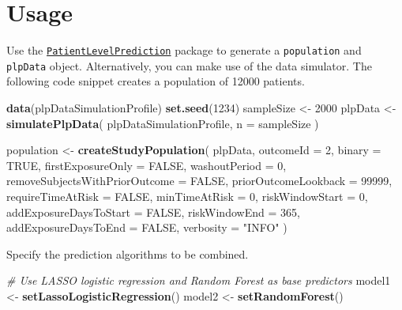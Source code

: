 \documentclass[
]{article}
\newenvironment{Shaded}{\begin{snugshade}}{\end{snugshade}}
\newcommand{\CommentTok}[1]{\textcolor[rgb]{0.56,0.35,0.01}{\textit{#1}}}
\newcommand{\DataTypeTok}[1]{\textcolor[rgb]{0.13,0.29,0.53}{#1}}
\newcommand{\DecValTok}[1]{\textcolor[rgb]{0.00,0.00,0.81}{#1}}
\newcommand{\KeywordTok}[1]{\textcolor[rgb]{0.13,0.29,0.53}{\textbf{#1}}}
\newcommand{\NormalTok}[1]{#1}
\newcommand{\OtherTok}[1]{\textcolor[rgb]{0.56,0.35,0.01}{#1}}
\newcommand{\StringTok}[1]{\textcolor[rgb]{0.31,0.60,0.02}{#1}}
\begin{document}
\hypertarget{usage}{%
\section{Usage}\label{usage}}

Use the
\href{http://github.com/OHDSI/PatientLevelPrediction}{\texttt{PatientLevelPrediction}}
package to generate a \texttt{population} and \texttt{plpData} object.
Alternatively, you can make use of the data simulator. The following
code snippet creates a population of 12000 patients.

\begin{Shaded}
\begin{Highlighting}[]
\KeywordTok{data}\NormalTok{(plpDataSimulationProfile)}
\KeywordTok{set.seed}\NormalTok{(}\DecValTok{1234}\NormalTok{)}
\NormalTok{sampleSize <-}\StringTok{ }\DecValTok{2000}
\NormalTok{plpData <-}\StringTok{ }\KeywordTok{simulatePlpData}\NormalTok{(}
\NormalTok{  plpDataSimulationProfile,}
  \DataTypeTok{n =}\NormalTok{ sampleSize}
\NormalTok{)}

\NormalTok{population <-}\StringTok{ }\KeywordTok{createStudyPopulation}\NormalTok{(}
\NormalTok{  plpData,}
  \DataTypeTok{outcomeId =} \DecValTok{2}\NormalTok{,}
  \DataTypeTok{binary =} \OtherTok{TRUE}\NormalTok{,}
  \DataTypeTok{firstExposureOnly =} \OtherTok{FALSE}\NormalTok{,}
  \DataTypeTok{washoutPeriod =} \DecValTok{0}\NormalTok{,}
  \DataTypeTok{removeSubjectsWithPriorOutcome =} \OtherTok{FALSE}\NormalTok{,}
  \DataTypeTok{priorOutcomeLookback =} \DecValTok{99999}\NormalTok{,}
  \DataTypeTok{requireTimeAtRisk =} \OtherTok{FALSE}\NormalTok{,}
  \DataTypeTok{minTimeAtRisk =} \DecValTok{0}\NormalTok{,}
  \DataTypeTok{riskWindowStart =} \DecValTok{0}\NormalTok{,}
  \DataTypeTok{addExposureDaysToStart =} \OtherTok{FALSE}\NormalTok{,}
  \DataTypeTok{riskWindowEnd =} \DecValTok{365}\NormalTok{,}
  \DataTypeTok{addExposureDaysToEnd =} \OtherTok{FALSE}\NormalTok{,}
  \DataTypeTok{verbosity =} \StringTok{"INFO"}
\NormalTok{)}
\end{Highlighting}
\end{Shaded}

Specify the prediction algorithms to be combined.

\begin{Shaded}
\begin{Highlighting}[]
\CommentTok{# Use LASSO logistic regression and Random Forest as base predictors}
\NormalTok{model1 <-}\StringTok{ }\KeywordTok{setLassoLogisticRegression}\NormalTok{()}
\NormalTok{model2 <-}\StringTok{ }\KeywordTok{setRandomForest}\NormalTok{()}
\end{Highlighting}
\end{Shaded}
\end{document}
